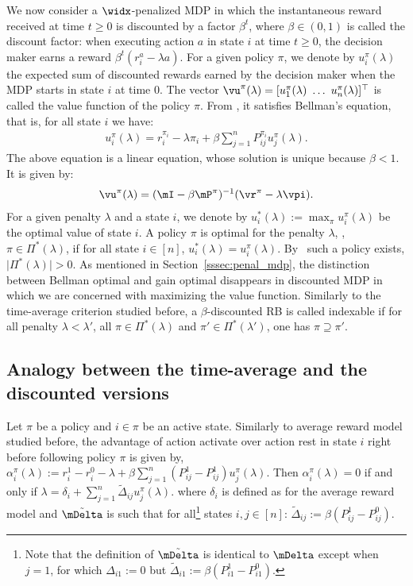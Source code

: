 We now consider a $\widx$-penalized MDP in which the instantaneous reward received at time $t\ge0$ is discounted by a factor $\beta^t$, where $\beta\in(0,1)$ is called the discount factor: when executing action $a$ in state $i$ at time $t\ge0$, the decision maker earns a reward $\beta^t (r^a_i - \lambda a)$. For a given policy $\pi$, we denote by $u^\pi_i(\lambda)$ the expected sum of discounted rewards earned by the decision maker when the MDP starts in state $i$ at time $0$. The vector $\vu^\pi(\lambda)=[u^\pi_1(\lambda)\ \dots\ u^\pi_n(\lambda)]^\top$ is called the value function of the policy $\pi$. From \cite{puterman2014markov}, it satisfies Bellman's equation, that is, for all state $i$ we have: 
\begin{align}
    \label{eq:u^pi_discounted}
    u^\pi_i(\lambda) = r_i^{\pi_i} - \lambda \pi_i + \beta \sum_{j=1}^n P^{\pi_i}_{ij} u^\pi_j(\lambda).
\end{align}
The above equation is a linear equation, whose solution is unique because $\beta<1$. It is given by:
\begin{align}
    \label{eq:h is linear discounted}
    \vu^\pi(\lambda) = (\mI - \beta \mP^\pi)^{-1}(\vr^{\pi} - \lambda \vpi).
\end{align}
For a given penalty $\lambda$ and a state $i$, we denote by $u^*_i(\lambda):=\max_\pi u^\pi_i(\lambda)$ be the optimal value of state $i$.  A policy $\pi$ is optimal for the penalty $\lambda$, \ie, $\pi\in\Pi^*(\lambda)$, if for all state $i\in[n]$, $u^*_i(\lambda)=u^\pi_i(\lambda)$. By~\cite{puterman2014markov} such a policy exists, $\lvert\Pi^*(\lambda)\rvert >0$.
As mentioned in Section~\ref{sssec:penal_mdp}, the distinction between Bellman optimal and gain optimal disappears in discounted MDP in which we are concerned with maximizing the value function.
Similarly to the time-average criterion studied before, a $\beta$-discounted RB is called indexable if for all penalty $\lambda<\lambda'$, all $\pi\in\Pi^*(\lambda)$ and $\pi'\in\Pi^*(\lambda')$, one has $\pi\supseteq\pi'$.

\subsection{Analogy between the time-average and the discounted versions}

Let $\pi$ be a policy and $i\in\pi$ be an active state.
Similarly to average reward model studied before, the advantage of action activate over action rest in state $i$ right before following policy $\pi$ is given by,
$\alpha^\pi_i(\lambda):=r^1_i -r^0_i -\lambda +\beta\sum_{j=1}^n (P^1_{ij} -P^1_{ij})u^\pi_j(\lambda)$.
Then $\alpha^\pi_i(\lambda)=0$ if and only if $\lambda = \delta_i + \sum_{j=1}^n\tilde{\Delta}_{ij} u_j^\pi(\lambda)$. 
where $\delta_i$ is defined as for the average reward model and $\tilde{\mDelta}$ is such that for all\footnote{Note that the definition of $\tilde{\mDelta}$ is identical to $\mDelta$ except when $j=1$, for which $\Delta_{i1}:=0$ but $\tilde{\Delta}_{i1}:=\beta(P^1_{i1}-P^0_{i1})$.} states $i,j\in[n]$: $\tilde{\Delta}_{ij}:=\beta(P^1_{ij}-P^0_{ij})$.

